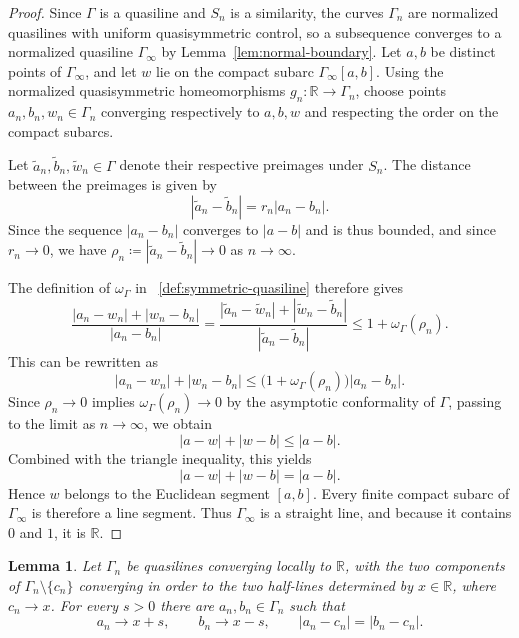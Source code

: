 \documentclass[11pt]{amsart}
\numberwithin{equation}{section}
\newtheorem{lemma}[theorem]{Lemma}
\theoremstyle{definition} %
\theoremstyle{remarkstyle}
\newcommand{\R}{\mathbb{R}}
\begin{document}
\begin{proof}
Since $\Gamma$ is a quasiline and $S_n$ is a similarity, the curves $\Gamma_n$ are normalized quasilines with uniform quasisymmetric control, so a subsequence converges to a normalized quasiline $\Gamma_\infty$ by Lemma~\ref{lem:normal-boundary}.
Let $a,b$ be distinct points of $\Gamma_\infty$, and let $w$ lie on the compact subarc $\Gamma_\infty[a,b]$.  
Using the normalized quasisymmetric homeomorphisms $g_n\colon\R\to \Gamma_n$, choose points $a_n,b_n,w_n\in\Gamma_n$ converging respectively to $a,b,w$ and respecting the order on the compact subarcs.  

Let $\tilde{a}_n, \tilde{b}_n, \tilde{w}_n \in \Gamma$ denote their respective preimages under $S_n$. 
The distance between the preimages is given by 
\[
 |\tilde{a}_n-\tilde{b}_n| = r_n|a_n-b_n|.
\]
Since the sequence $|a_n-b_n|$ converges to $|a-b|$ and is thus bounded, and since $r_n \to 0$, we have $\rho_n \coloneqq  |\tilde{a}_n-\tilde{b}_n| \to 0$ as $n \to \infty$. 

The definition of $\omega_\Gamma$ in ~\eqref{def:symmetric-quasiline} therefore gives
\[
 \frac{|a_n-w_n|+|w_n-b_n|}{|a_n-b_n|} = \frac{|\tilde{a}_n-\tilde{w}_n|+|\tilde{w}_n-\tilde{b}_n|}{|\tilde{a}_n-\tilde{b}_n|} \leq 1 + \omega_\Gamma(\rho_n).
\]
This can be rewritten as
\[
 |a_n-w_n|+|w_n-b_n| \leq \bigl(1+\omega_\Gamma(\rho_n)\bigr)|a_n-b_n|.
\]
Since $\rho_n \to 0$ implies $\omega_\Gamma(\rho_n) \to 0$ by the asymptotic conformality of $\Gamma$,
passing to the limit as $n \to \infty$, we obtain
\[
 |a-w|+|w-b| \leq |a-b|.
\]
Combined with the triangle inequality, this yields
\[
 |a-w|+|w-b|=|a-b|.
\]
Hence $w$ belongs to the Euclidean segment $[a,b]$.  
Every finite compact subarc of $\Gamma_\infty$ is therefore a line segment. 
Thus $\Gamma_\infty$ is a straight line, and because it contains $0$ and $1$, it is $\R$.
\end{proof}

\begin{lemma}\label{lem:equidistant-approx}
Let $\Gamma_n$ be quasilines converging locally to $\R$, with the two components of $\Gamma_n\setminus\{c_n\}$ converging in order to the two half-lines determined by $x\in\R$, where $c_n\to x$.  
For every $s>0$ there are $a_n,b_n\in\Gamma_n$ such that
\[
 a_n\to x+s,\qquad b_n\to x-s,
 \qquad |a_n-c_n|=|b_n-c_n|.
\]
\end{lemma}
\end{document}
